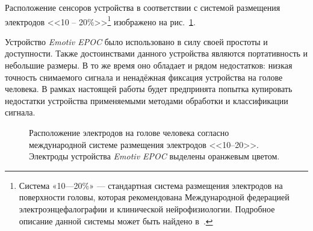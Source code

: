 \documentclass[12pt,a4paper,oneside,fleqn,leqno]{article}
\begin{document}
	\par Расположение сенсоров устройства в соответствии с системой размещения электродов <<10 -- 20\%>>\footnote{Система «10—20\%» — стандартная система размещения электродов на поверхности головы, которая рекомендована Международной федерацией электроэнцефалографии и клинической нейрофизиологии. Подробное описание данной системы может быть найдено в~\cite{system10-20}.} изображено на рис.~\ref{electrode_map}.

	\par Устройство {\it Emotiv EPOC} было использовано в силу своей простоты и доступности. Также достоинствами данного устройства являются портативность и небольшие размеры. В то же время оно обладает и рядом недостатков: низкая точность снимаемого сигнала и ненадёжная фиксация устройства на голове человека. В рамках настоящей работы будет предпринята попытка купировать недостатки устройства применяемыми методами обработки и классификации сигнала.

	\begin{figure}[h!]
		\caption{Расположение электродов на голове человека согласно международной системе размещения электродов <<10--20>>. Электроды устройства {\it Emotiv EPOC} выделены оранжевым цветом.}
	\label{electrode_map}
	\end{figure}
\end{document}
